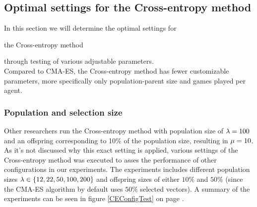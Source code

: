 \subsection{Optimal settings 
for the Cross-entropy method \label{optimalsettingsce}}

In this section we will determine the optimal settings for \begin{changebar}
the Cross-entropy method
\end{changebar} through testing
of various adjustable parameters.\\
Compared to CMA-ES, the Cross-entropy method has fewer customizable parameters, more specifically 
only population-parent size and games played per agent.

\subsubsection{Population and selection size}
Other researchers run the Cross-entropy method with population size of
$\lambda = 100$ and an offspring corresponding to 10\% of 
the population size, resulting in $\mu = 10$. As it's not 
discussed why this exact setting is applied, various settings of the Cross-entropy method
was executed to asses the performance of other configurations
in our experiments.
The experiments includes different population sizes 
$\lambda \in \{12, 22, 50, 100, 200\}$ and offspring 
sizes of either $10\%$ and $50\%$ (since the CMA-ES algorithm by default
uses $50 \%$ selected vectors). 
A summary of the experiments can be seen in figure \ref{CEConfigTest}
on page \pageref{CEConfigTest}.

